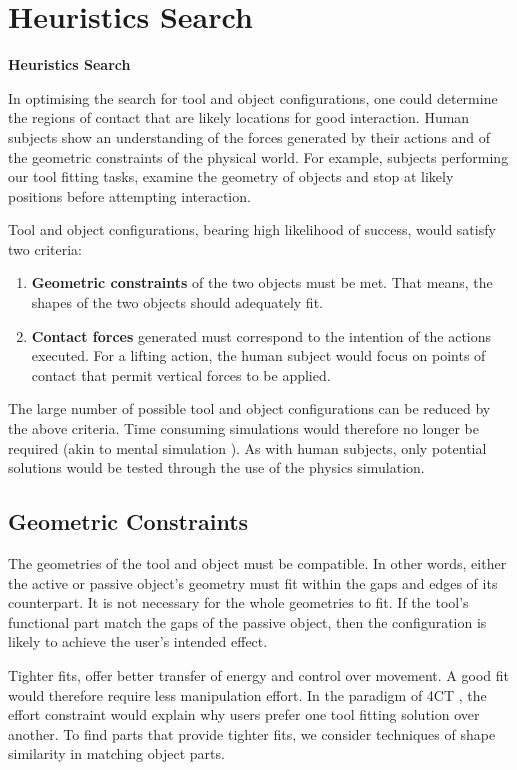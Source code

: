 \documentclass[11]{article}
\let \shorttitle \textbf
\begin{document}
\section{Heuristics Search}

\shorttitle{Heuristics Search}

In optimising the search for tool and object configurations, one could determine the regions of contact that are likely locations for good interaction.
Human subjects show an understanding of the forces generated by their actions and of the geometric constraints of the physical world.
For example, subjects performing our tool fitting tasks, examine the geometry of objects and stop at likely positions before attempting interaction.  

\pagebreak[3]
Tool and object configurations, bearing high likelihood of success, would satisfy two criteria: 
\begin{enumerate}
\itemsep0em 
\item \textbf{Geometric constraints} of the two objects must be met. That means, the shapes of the two objects should adequately fit.
\item \textbf{Contact forces} generated must correspond to the intention of the actions executed. 
  For a lifting action, the human subject would focus on points of contact that permit vertical forces to be applied.
\end{enumerate}

The large number of possible tool and object configurations can be reduced by the above criteria. Time consuming simulations would therefore no longer be required (akin to mental simulation \cite{osiurak2014}).
As with human subjects, only potential solutions would be tested through the use of the physics simulation. 

\subsection{Geometric Constraints}
The geometries of the tool and object must be compatible.
In other words, either the active or passive object’s geometry must fit within the gaps and edges of its counterpart.
It is not necessary for the whole geometries to fit.  
If the tool's functional part match the gaps of the passive object, then the configuration is likely to achieve the user's intended effect. 

Tighter fits, offer better transfer of energy and control over movement.
A good fit would therefore require less manipulation effort.
In the paradigm of 4CT \cite{osiurak2014}, the effort constraint would explain why users prefer one tool fitting solution over another. 
To find parts that provide tighter fits, we consider techniques of shape similarity in matching object parts.
\end{document}
